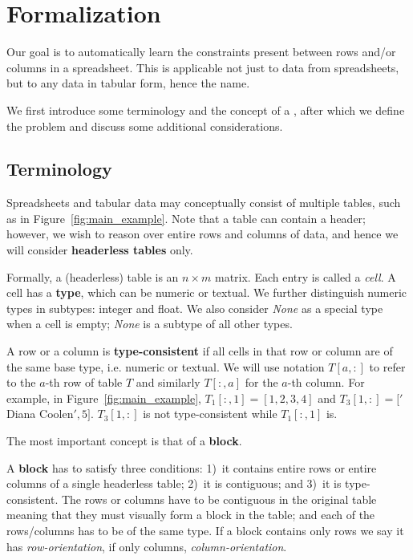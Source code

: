 \section{Formalization}\label{sec:formalization}
Our goal is to automatically learn the constraints present between rows and/or columns in a spreadsheet. This is applicable not just to data from spreadsheets, but to any data in tabular form, hence the name.


We first introduce some terminology and the concept of a \template, after which we define the problem and discuss some additional considerations.

\subsection{Terminology}
Spreadsheets and tabular data may conceptually consist of multiple tables, such as in Figure~\ref{fig:main_example}. Note that a table can contain a header; however, we wish to reason over entire rows and columns of data, and hence we will consider \textbf{headerless tables} only.

Formally, a (headerless) table is an $n \times m$ matrix. Each entry is called a \textit{cell}.
A cell has a {\bf type}, which can be numeric or textual. We further distinguish numeric types in subtypes: integer and float. We also consider \textit{None} as a special type when a cell is empty; \textit{None} is a subtype of all other types.

A row or a column is \textbf{type-consistent} if all cells in that row or column are of the same base type, i.e. numeric or textual.
We will use notation $T[a,{:}]$ to refer to the $a$-th row of table $T$ and similarly $T[{:},a]$ for the $a$-th column.
For example, in Figure~\ref{fig:main_example}, $T_1[:,1] = [1,2,3,4]$ and $T_3[1,:] = ['$Diana Coolen$', 5]$.
$T_3[1, :]$ is not type-consistent while $T_1[:, 1]$ is.

The most important concept is that of a \textbf{block}. 
\begin{definition}
A \textbf{block} has to satisfy three conditions: 1)~it contains entire rows or entire columns of a single headerless table; 2)~it is contiguous; and 3)~it is type-consistent.
The rows or columns have to be contiguous in the original table meaning that they must visually form a block in the table; and each of the rows/columns has to be of the same type. 
If a block contains only rows we say it has \textit{row-orientation}, if only columns, \textit{column-orientation}. 
\end{definition}

